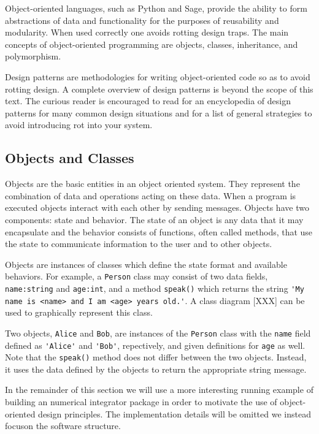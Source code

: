 Object-oriented languages, such as Python and Sage, provide the ability to form
abstractions of data and functionality for the purposes of reusability and
modularity. When used correctly one avoids rotting design traps. The main
concepts of object-oriented programming are objects, classes, inheritance, and
polymorphism.

Design patterns are methodologies for writing object-oriented code so as to
avoid rotting design. A complete overview of design patterns is beyond the scope
of this text. The curious reader is encouraged to read \cite{gamma1995design}
for an encyclopedia of design patterns for many common design situations and
\cite{martin2000design} for a list of general strategies to avoid introducing
rot into your system.



\subsection{Objects and Classes}

Objects are the basic entities in an object oriented system. They represent the
combination of data and operations acting on these data. When a program is
executed objects interact with each other by sending messages. Objects have two
components: state and behavior. The state of an object is any data that it may
encapsulate and the behavior consists of functions, often called methods, that
use the state to communicate information to the user and to other objects.

Objects are instances of classes which define the state format and available
behaviors. For example, a \verb=Person= class may consist of two data fields,
\verb=name:string= and \verb=age:int=, and a method \verb=speak()= which returns
the string \verb='My name is <name> and I am <age> years old.'=. A class diagram
[XXX] can be used to graphically represent this class.


Two objects, \verb=Alice= and \verb=Bob=, are instances of the \verb=Person=
class with the \verb=name= field defined as \verb='Alice'= and \verb='Bob'=,
repectively, and given definitions for \verb=age= as well. Note that the
\verb=speak()= method does not differ between the two objects. Instead, it uses
the data defined by the objects to return the appropriate string message.

In the remainder of this section we will use a more interesting running example
of building an numerical integrator package in order to motivate the use of
object-oriented design principles. The implementation details will be
omitted we instead focuson the software structure.

